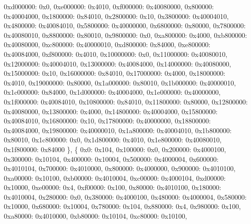 \begin{DoxyCodeInclude}
            0xd000000: 0x0,
            0xe000000: 0x4010,
            0xf000000: 0x40080000,
            0x800000: 0x40004000,
            0x1800000: 0x84010,
            0x2800000: 0x10,
            0x3800000: 0x40004010,
            0x4800000: 0x40084010,
            0x5800000: 0x40000000,
            0x6800000: 0x80000,
            0x7800000: 0x40080010,
            0x8800000: 0x80010,
            0x9800000: 0x0,
            0xa800000: 0x4000,
            0xb800000: 0x40080000,
            0xc800000: 0x40000010,
            0xd800000: 0x84000,
            0xe800000: 0x40084000,
            0xf800000: 0x4010,
            0x10000000: 0x0,
            0x11000000: 0x40080010,
            0x12000000: 0x40004010,
            0x13000000: 0x40084000,
            0x14000000: 0x40080000,
            0x15000000: 0x10,
            0x16000000: 0x84010,
            0x17000000: 0x4000,
            0x18000000: 0x4010,
            0x19000000: 0x80000,
            0x1a000000: 0x80010,
            0x1b000000: 0x40000010,
            0x1c000000: 0x84000,
            0x1d000000: 0x40004000,
            0x1e000000: 0x40000000,
            0x1f000000: 0x40084010,
            0x10800000: 0x84010,
            0x11800000: 0x80000,
            0x12800000: 0x40080000,
            0x13800000: 0x4000,
            0x14800000: 0x40004000,
            0x15800000: 0x40084010,
            0x16800000: 0x10,
            0x17800000: 0x40000000,
            0x18800000: 0x40084000,
            0x19800000: 0x40000010,
            0x1a800000: 0x40004010,
            0x1b800000: 0x80010,
            0x1c800000: 0x0,
            0x1d800000: 0x4010,
            0x1e800000: 0x40080010,
            0x1f800000: 0x84000
        \},
        \{
            0x0: 0x104,
            0x100000: 0x0,
            0x200000: 0x4000100,
            0x300000: 0x10104,
            0x400000: 0x10004,
            0x500000: 0x4000004,
            0x600000: 0x4010104,
            0x700000: 0x4010000,
            0x800000: 0x4000000,
            0x900000: 0x4010100,
            0xa00000: 0x10100,
            0xb00000: 0x4010004,
            0xc00000: 0x4000104,
            0xd00000: 0x10000,
            0xe00000: 0x4,
            0xf00000: 0x100,
            0x80000: 0x4010100,
            0x180000: 0x4010004,
            0x280000: 0x0,
            0x380000: 0x4000100,
            0x480000: 0x4000004,
            0x580000: 0x10000,
            0x680000: 0x10004,
            0x780000: 0x104,
            0x880000: 0x4,
            0x980000: 0x100,
            0xa80000: 0x4010000,
            0xb80000: 0x10104,
            0xc80000: 0x10100,

\end{DoxyCodeInclude}
